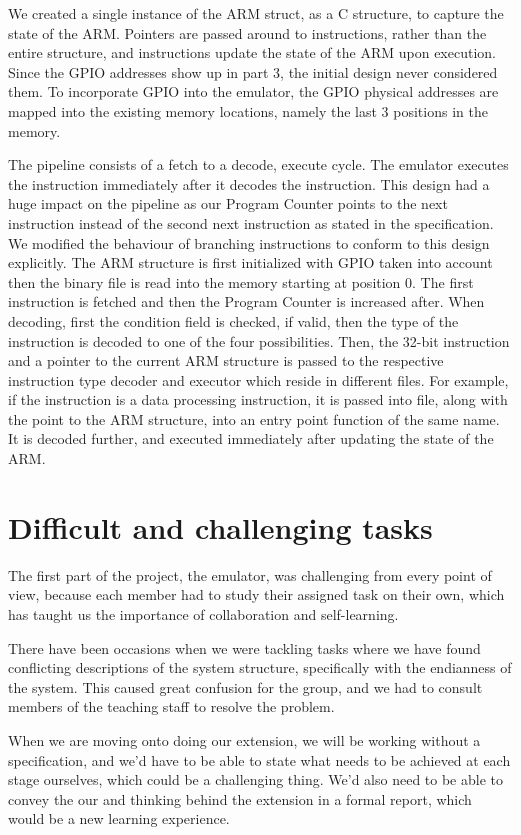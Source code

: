 \documentclass[10pt,a4paper]{article}
\begin{document}
We created a single instance of the ARM struct, as a C structure, to capture the state of the ARM. Pointers are passed around to instructions, rather than the entire structure, and instructions update the state of the ARM upon execution. Since the GPIO addresses show up in part 3, the initial design never considered them. To incorporate GPIO into the emulator, the GPIO physical addresses are mapped into the existing memory locations, namely the last 3 positions in the memory. 

The pipeline consists of a fetch to a decode, execute cycle. The emulator executes the instruction immediately after it decodes the instruction. This design had a huge impact on the pipeline as our Program Counter points to the next instruction instead of the second next instruction as stated in the specification. We modified the behaviour of branching instructions to conform to this design explicitly. The ARM structure is first initialized with GPIO taken into account then the binary file is read into the memory starting at position 0. The first instruction is fetched and then the Program Counter is increased after. When decoding, first the condition field is checked, if valid, then the type of the instruction is decoded to one of the four possibilities. Then, the 32-bit instruction and a pointer to the current ARM structure is passed to the respective instruction type decoder and executor which reside in different files. For example, if the instruction is a data processing instruction, it is passed into  file, along with the point to the ARM structure, into an entry point function of the same name. It is decoded further, and executed immediately after updating the state of the ARM. 

\section{Difficult and challenging tasks}
The first part of the project, the emulator, was challenging from every point of view, because each member had to study their assigned task on their own, which has taught us the importance of collaboration and self-learning. 

There have been occasions when we were tackling tasks where we have found conflicting descriptions of the system structure, specifically with the endianness of the system. This caused great confusion for the group, and we had to consult members of the teaching staff to resolve the problem.

When we are moving onto doing our extension, we will be working without a specification, and we'd have to be able to state what needs to be achieved at each stage ourselves, which could be a challenging thing. We'd also need to be able to convey the our and thinking behind the extension in a formal report, which would be a new learning experience.
\end{document}
